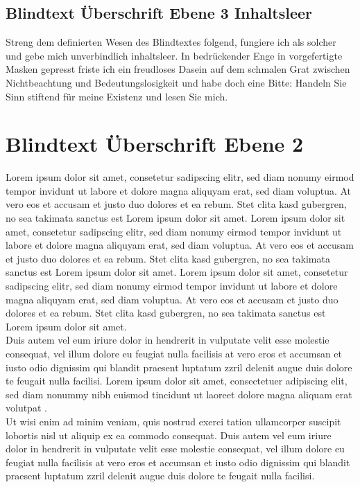 \documentclass[
	ngerman,
	ruledheaders=section,%
	class=report,%
	thesis={type=bachelor},%
	accentcolor=1b,%
	custommargins=true,%
	marginpar=false,%
	parskip=half-,%
	fontsize=11pt,%
	DIV=14,
]{tudapub}
\begin{document}
\subsection{Blindtext Überschrift Ebene 3 Inhaltsleer}
Streng dem definierten Wesen des Blindtextes folgend, fungiere ich als solcher und gebe mich unverbindlich inhaltsleer. In bedrückender Enge in vorgefertigte Masken gepresst friste ich ein freudloses Dasein auf dem schmalen Grat zwischen Nichtbeachtung und Bedeutungslosigkeit und habe doch eine Bitte: Handeln Sie Sinn stiftend für meine Existenz und lesen Sie mich.
\section{Blindtext Überschrift Ebene 2}
Lorem ipsum dolor sit amet, consetetur sadipscing elitr, sed diam nonumy eirmod tempor invidunt ut labore et dolore magna aliquyam erat, sed diam voluptua. At vero eos et accusam et justo duo dolores et ea rebum. Stet clita kasd gubergren, no sea takimata sanctus est Lorem ipsum dolor sit amet. Lorem ipsum dolor sit amet, consetetur sadipscing elitr, sed diam nonumy eirmod tempor invidunt ut labore et dolore magna aliquyam erat, sed diam voluptua. At vero eos et accusam et justo duo dolores et ea rebum. Stet clita kasd gubergren, no sea takimata sanctus est Lorem ipsum dolor sit amet. Lorem ipsum dolor sit amet, consetetur sadipscing elitr, sed diam nonumy eirmod tempor invidunt ut labore et dolore magna aliquyam erat, sed diam voluptua. At vero eos et accusam et justo duo dolores et ea rebum. Stet clita kasd gubergren, no sea takimata sanctus est Lorem ipsum dolor sit amet.\\
Duis autem vel eum iriure dolor in hendrerit in vulputate velit esse molestie consequat, vel illum dolore eu feugiat nulla facilisis at vero eros et accumsan et iusto odio dignissim qui blandit praesent luptatum zzril delenit augue duis dolore te feugait nulla facilisi. Lorem ipsum dolor sit amet, consectetuer adipiscing elit, sed diam nonummy nibh euismod tincidunt ut laoreet dolore magna aliquam erat volutpat \parencite{emse-03339298, koppe2021herausforderungen}.\\
Ut wisi enim ad minim veniam, quis nostrud exerci tation ullamcorper suscipit lobortis nisl ut aliquip ex ea commodo consequat. Duis autem vel eum iriure dolor in hendrerit in vulputate velit esse molestie consequat, vel illum dolore eu feugiat nulla facilisis at vero eros et accumsan et iusto odio dignissim qui blandit praesent luptatum zzril delenit augue duis dolore te feugait nulla facilisi.\\
\end{document}
